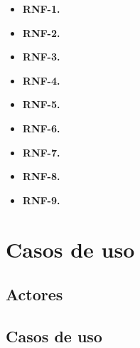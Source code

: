 \begin{itemize}
  \item \textbf{RNF-1.} 
  \item \textbf{RNF-2.} 
  \item \textbf{RNF-3.} 
  \item \textbf{RNF-4.} 
  \item \textbf{RNF-5.} 
  \item \textbf{RNF-6.} 
  \item \textbf{RNF-7.} 
  \item \textbf{RNF-8.} 
  \item \textbf{RNF-9.} 
\end{itemize}


\section{Casos de uso}

\subsection{Actores}

\subsection{Casos de uso}

